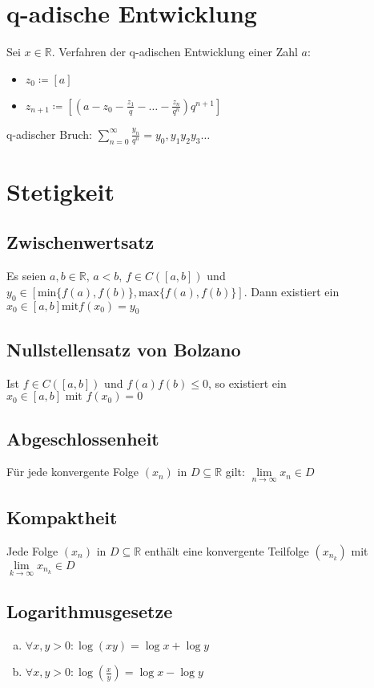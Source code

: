 \documentclass{article}
\begin{document}
\section{q-adische Entwicklung}
Sei $x \in \mathbb{R}$. Verfahren der q-adischen Entwicklung einer Zahl $a$:
\begin{itemize}
    \item $z_0 \coloneqq [a]$
    \item $z_{n+1} \coloneqq [(a - z_0 - \frac{z_1}{q} - \ldots - \frac{z_n}{q^n}) q^{n+1}]$
\end{itemize}
q-adischer Bruch: $\sum \limits_{n=0}^{\infty} \frac{y_n}{q^n} = y_0,y_1y_2y_3\ldots$

\section{Stetigkeit}

\subsection{Zwischenwertsatz}
Es seien $a,b \in \mathbb{R}\text{, } a<b \text{, } f \in C ([a,b])$ und $y_0 \in [\text{min}\{f(a), f(b)\}, \text{max}\{f(a), f(b)\}]$. Dann existiert ein $x_0 \in [a,b] \text{mit} f(x_0)=y_0$

\subsection{Nullstellensatz von Bolzano}
Ist $f \in C([a,b])$ und $f(a)f(b) \leq 0$, so existiert ein $x_0 \in [a,b] \text{ mit } f(x_0)=0$ \\

\subsection{Abgeschlossenheit}
Für jede konvergente Folge $(x_n)$ in $D \subseteq \mathbb{R}$ gilt: $\lim \limits_{n \to \infty} x_n \in D$

\subsection{Kompaktheit}
Jede Folge $(x_n)$ in $D \subseteq \mathbb{R}$ enthält eine konvergente Teilfolge $(x_{n_k})$ mit $\lim \limits_{k \to \infty} x_{n_k} \in D$

\subsection{Logarithmusgesetze}
\begin{enumerate}[a)]
    \item $\forall x,y > 0: \log(xy) = \log x + \log y$
    \item $\forall x,y > 0: \log(\frac{x}{y}) = \log x - \log y$
\end{enumerate}
\end{document}
